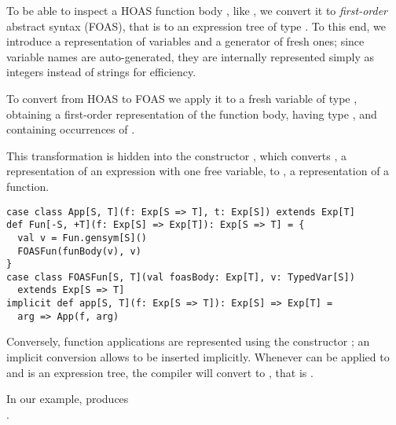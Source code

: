 To be able to inspect a HOAS function body \linebreak{}, like , we convert it to \emph{first-order} abstract syntax (FOAS), that is to an expression tree of type .
To this end, we introduce a representation of variables and a generator of fresh ones; since variable names are auto-generated, they are internally represented simply as integers instead of strings for efficiency.

To convert  from HOAS to FOAS we apply it to a fresh variable  of type , obtaining a first-order representation of the function body, having type , and containing occurrences of .

This transformation is hidden into the constructor , which converts , a representation of an expression with one free variable, to , a representation of a function.

\begin{lstlisting}
case class App[S, T](f: Exp[S => T], t: Exp[S]) extends Exp[T]
def Fun[-S, +T](f: Exp[S] => Exp[T]): Exp[S => T] = {
  val v = Fun.gensym[S]()
  FOASFun(funBody(v), v)
}
case class FOASFun[S, T](val foasBody: Exp[T], v: TypedVar[S])
  extends Exp[S => T]
implicit def app[S, T](f: Exp[S => T]): Exp[S] => Exp[T] =
  arg => App(f, arg)
\end{lstlisting}

Conversely, function applications are represented using the constructor ; an implicit conversion allows  to be inserted implicitly. Whenever  can be applied to  and  is an expression tree, the compiler will convert  to , that is .


In our example,  produces\\
%
.

